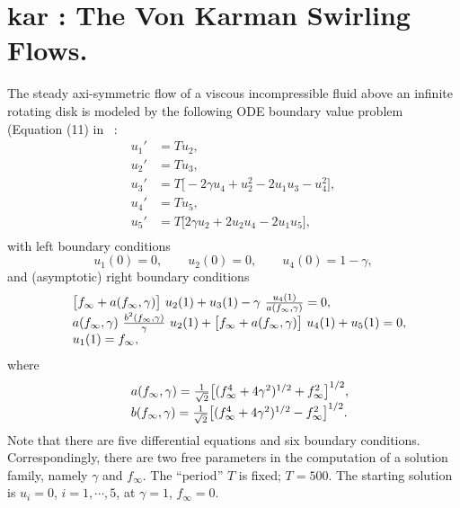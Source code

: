 \documentclass[12pt]{report}
\begin{document}
\newpage
\section{ kar : The Von Karman Swirling Flows.} \label{sec:Demos_kar}
The steady axi-symmetric flow of a viscous incompressible fluid
above an infinite rotating disk is modeled by the following 
ODE boundary value problem (Equation (11) in
 \citeyear{LeKe:80}~:
\begin{equation} \begin{array}{cl}
  u_1' &= T u_2,  \\
  u_2' &= T u_3,  \\
  u_3' &= T \bigl[ -2 \gamma u_4 + u_2^2 - 2 u_1 u_3 - u_4^2 \bigr], \\
  u_4' &= T u_5, \\
  u_5' &= T \bigl[ 2 \gamma u_2 + 2 u_2 u_4 - 2 u_1 u_5 \bigr], \\
\end{array} \end{equation}
with left boundary conditions
$$ u_1(0)=0, \qquad u_2(0)=0, \qquad u_4(0)=1-\gamma, $$
and (asymptotic) right boundary conditions
\begin{equation} \begin{array}{cl}
  & \bigl[ f_\infty + a(f_\infty,\gamma) \bigr] ~ u_2(1) + u_3(1)
  - \gamma ~ { u_4(1) \over a(f_\infty,\gamma) } = 0,  \\
  & a(f_\infty,\gamma)~ { b^2(f_\infty,\gamma) \over \gamma } ~u_2(1)
  + \bigl[ f_\infty + a(f_\infty,\gamma) \bigr] ~u_4(1) 
  + u_5(1) = 0, \\
 & u_1(1) = f_\infty,
 \end{array} \end{equation}
where
\begin{equation} \begin{array}{cl}
 & a(f_\infty,\gamma) = {1 \over \sqrt{2} }
  \bigl[ (f_\infty^4 + 4 \gamma^2)^{1/2} + f_\infty^2 \bigr]^{1/2}, \\
 & b(f_\infty,\gamma) = {1 \over \sqrt{2} }
  \bigl[ (f_\infty^4 + 4 \gamma^2)^{1/2} - f_\infty^2 \bigr]^{1/2}.  \\
\end{array} \end{equation}
Note that there are five differential equations and six boundary conditions.
Correspondingly, there are two free parameters in the computation of a 
solution family, namely $\gamma$ and $f_\infty$.
The ``period'' $T$ is fixed; $T=500$.
The starting solution is $u_i=0$, $i=1,\cdots,5$, 
at $\gamma=1$, $f_\infty=0$.
\end{document}

